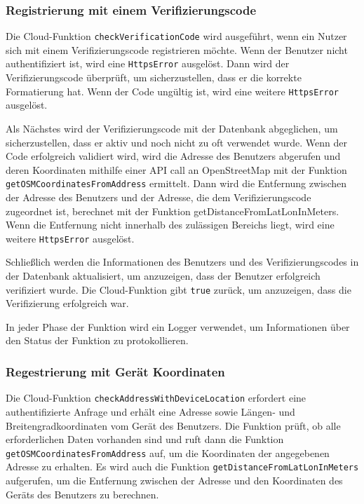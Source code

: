 \subsubsection{Registrierung mit einem Verifizierungscode}\label{subsec:registrierung-verify}

Die Cloud-Funktion \texttt{checkVerificationCode} wird ausgeführt, wenn ein Nutzer sich mit einem Verifizierungscode registrieren möchte. Wenn der Benutzer nicht authentifiziert ist, wird eine \texttt{HttpsError} ausgelöst. Dann wird der Verifizierungscode überprüft, um sicherzustellen, dass er die korrekte Formatierung hat. Wenn der Code ungültig ist, wird eine weitere \texttt{HttpsError} ausgelöst.

Als Nächstes wird der Verifizierungscode mit der Datenbank abgeglichen, um sicherzustellen, dass er aktiv und noch nicht zu oft verwendet wurde. Wenn der Code erfolgreich validiert wird, wird die Adresse des Benutzers abgerufen und deren Koordinaten mithilfe einer API call an OpenStreetMap mit der Funktion \texttt{getOSMCoordinatesFromAddress} ermittelt. Dann wird die Entfernung zwischen der Adresse des Benutzers und der Adresse, die dem Verifizierungscode zugeordnet ist, berechnet mit der Funktion getDistanceFromLatLonInMeters. Wenn die Entfernung nicht innerhalb des zulässigen Bereichs liegt, wird eine weitere \texttt{HttpsError} ausgelöst.

Schließlich werden die Informationen des Benutzers und des Verifizierungscodes in der Datenbank aktualisiert, um anzuzeigen, dass der Benutzer erfolgreich verifiziert wurde. Die Cloud-Funktion gibt \texttt{true} zurück, um anzuzeigen, dass die Verifizierung erfolgreich war.

In jeder Phase der Funktion wird ein Logger verwendet, um Informationen über den Status der Funktion zu protokollieren.

\subsubsection{Regestrierung mit Gerät Koordinaten}

Die Cloud-Funktion \texttt{checkAddressWithDeviceLocation} erfordert eine authentifizierte Anfrage und erhält eine Adresse sowie Längen- und Breitengradkoordinaten vom Gerät des Benutzers. Die Funktion prüft, ob alle erforderlichen Daten vorhanden sind und ruft dann die Funktion \texttt{getOSMCoordinatesFromAddress} auf, um die Koordinaten der angegebenen Adresse zu erhalten. Es wird auch die Funktion \texttt{getDistanceFromLatLonInMeters} aufgerufen, um die Entfernung zwischen der Adresse und den Koordinaten des Geräts des Benutzers zu berechnen.

